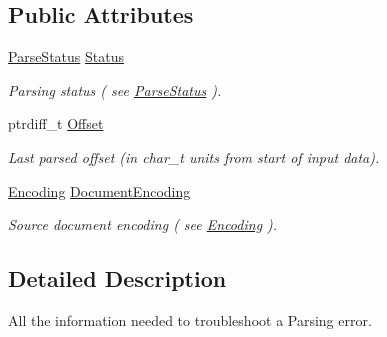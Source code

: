 \subsection*{Public Attributes}
\begin{DoxyCompactItemize}
\item 
\hypertarget{structphys_1_1xml_1_1ParseResult_a1bf9dfeebdb07656723bbaf18ab612b5}{
\hyperlink{namespacephys_1_1xml_ae7aabb879b21c73d8183a54470f8917f}{ParseStatus} \hyperlink{structphys_1_1xml_1_1ParseResult_a1bf9dfeebdb07656723bbaf18ab612b5}{Status}}
\label{d5/dea/structphys_1_1xml_1_1ParseResult_a1bf9dfeebdb07656723bbaf18ab612b5}

\begin{DoxyCompactList}\small\item\em Parsing status ( see \hyperlink{namespacephys_1_1xml_ae7aabb879b21c73d8183a54470f8917f}{ParseStatus} ). \item\end{DoxyCompactList}\item 
\hypertarget{structphys_1_1xml_1_1ParseResult_a30b2a5fa6ceae01ab30c6ff48273ce41}{
ptrdiff\_\-t \hyperlink{structphys_1_1xml_1_1ParseResult_a30b2a5fa6ceae01ab30c6ff48273ce41}{Offset}}
\label{d5/dea/structphys_1_1xml_1_1ParseResult_a30b2a5fa6ceae01ab30c6ff48273ce41}

\begin{DoxyCompactList}\small\item\em Last parsed offset (in char\_\-t units from start of input data). \item\end{DoxyCompactList}\item 
\hypertarget{structphys_1_1xml_1_1ParseResult_a95c39cf7a95875a4cd9708656a976dfc}{
\hyperlink{namespacephys_1_1xml_a420f5de782438f88160321385bea2015}{Encoding} \hyperlink{structphys_1_1xml_1_1ParseResult_a95c39cf7a95875a4cd9708656a976dfc}{DocumentEncoding}}
\label{d5/dea/structphys_1_1xml_1_1ParseResult_a95c39cf7a95875a4cd9708656a976dfc}

\begin{DoxyCompactList}\small\item\em Source document encoding ( see \hyperlink{namespacephys_1_1xml_a420f5de782438f88160321385bea2015}{Encoding} ). \item\end{DoxyCompactList}\end{DoxyCompactItemize}


\subsection{Detailed Description}
All the information needed to troubleshoot a Parsing error. 

